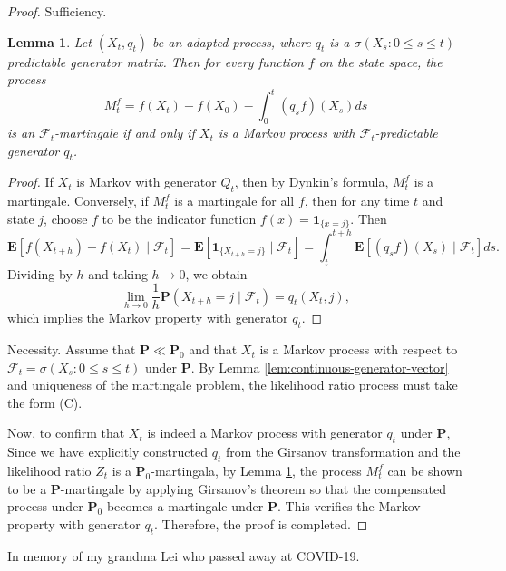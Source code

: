 \documentclass{lms}
\newtheorem{lemma}[theorem]{Lemma}     %
\begin{document}
\begin{proof} {Sufficiency.}
\begin{lemma}\label{lem: Dynkin lemma} Let \((X_t, q_t)\) be an adapted process, where \(q_t\) is a $\sigma(X_s:0 \le s \le t)$-predictable generator matrix. Then for every function \(f\) on the state space, the process
\begin{equation}
    M_t^f = f(X_t) - f(X_0) - \int_0^t (q_s f)(X_s) ds
    \label{eq: markov martingale continuous case}
\end{equation}is an \(\mathscr{F}_t\)-martingale if and only if \(X_t\) is a Markov process with \(\mathscr{F}_t\)-predictable generator \(q_t\).\end{lemma}
\begin{proof}
If \(X_t\) is Markov with generator \(Q_t\), then by Dynkin's formula, \(M_t^f\) is a martingale. Conversely, if \(M_t^f\) is a martingale for all \(f\), then for any time \(t\) and state \(j\), choose \(f\) to be the indicator function \(f(x) = \mathbf{1}_{\{x = j\}}\). Then
\[
\mathbf{E}[f(X_{t+h}) - f(X_t) \mid \mathscr{F}_t] = \mathbf{E}[\mathbf{1}_{\{X_{t+h} = j\}} \mid \mathscr{F}_t] = \int_t^{t+h} \mathbf{E}[(q_s f)(X_s) \mid \mathscr{F}_t] ds.
\]
Dividing by \(h\) and taking \(h \to 0\), we obtain
\[
\lim_{h \to 0} \frac{1}{h} \mathbf{P}(X_{t+h} = j \mid \mathscr{F}_t) = q_t(X_t, j),
\]
which implies the Markov property with generator \(q_t\).
\end{proof}

{Necessity.} Assume that \(\mathbf{P} \ll \mathbf{P}_0\) and that \(X_t\) is a Markov process with respect to \(\mathscr{F}_t = \sigma(X_s: 0 \le s \le t)\) under \(\mathbf{P}\). By Lemma \ref{lem:continuous-generator-vector} and uniqueness of the martingale problem, the likelihood ratio process must take the form (C).

Now, to confirm that \(X_t\) is indeed a Markov process with generator \(q_t\) under \(\mathbf{P}\), Since we have explicitly constructed \(q_t\) from the Girsanov transformation and the likelihood ratio \(Z_t\) is a \(\mathbf{P}_0\)-martingala, by Lemma \ref{lem: Dynkin lemma}, the process \(M_t^f\) can be shown to be a \(\mathbf{P}\)-martingale by applying Girsanov's theorem so that the compensated process under \(\mathbf{P}_0\) becomes a martingale under \(\mathbf{P}\). This verifies the Markov property with generator \(q_t\). Therefore, the proof is completed.
\end{proof}






\oneappendix %


\begin{acknowledgements}\label{ackref}
In memory of my grandma Lei who passed away at COVID-19.
\end{acknowledgements}





\end{document}
